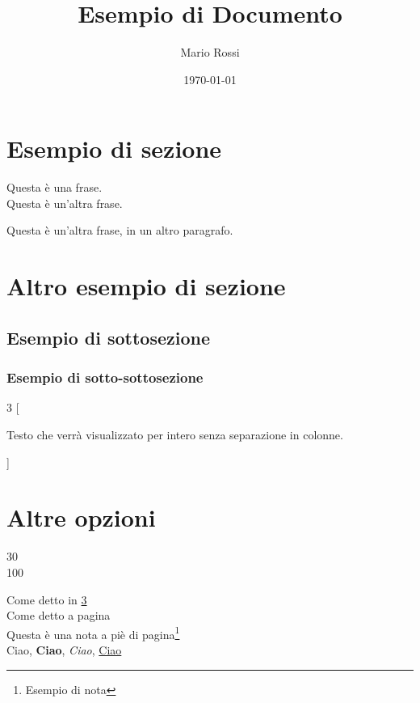 \documentclass[a4paper, 12pt]{article} %
\title{Esempio di Documento}
\author{Mario Rossi}
\date{\today}
\renewcommand{\contentsname}{Indice}
\begin{document}
\maketitle
\tableofcontents %
\newpage

\section{Esempio di sezione}
Questa è una frase. \\
Questa è un'altra frase.

Questa è un'altra frase, in un altro paragrafo.

\section{Altro esempio di sezione}
\lipsum[1]
\subsection{Esempio di sottosezione}
\lipsum[2]
\subsubsection{Esempio di sotto-sottosezione}
\begin{multicols}{3}
[
\begin{large}
Testo che verrà visualizzato per intero senza separazione in colonne.
\end{large} %
]
\lipsum[3-5]
\end{multicols}


\section{Altre opzioni}
\label{opzioni}
30\textcelsius \\
100\texteuro %

\noindent
Come detto in \ref{opzioni} \\
Come detto a pagina \pageref{opzioni} \\
Questa è una nota a piè di pagina\footnote{Esempio di nota} \\
Ciao, \textbf{Ciao}, \textit{Ciao}, \underline{Ciao} \\
\end{document}
